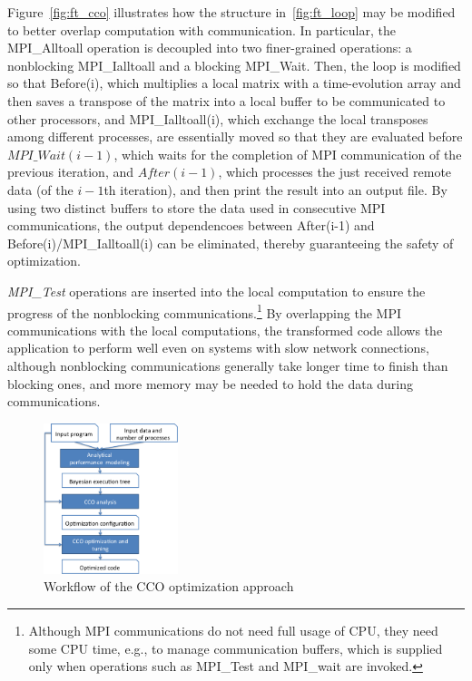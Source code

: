 Figure~\ref{fig:ft_cco} illustrates how the structure in~\ref{fig:ft_loop} may be modified to better overlap computation with communication.
In particular,
   the MPI\_Alltoall operation is decoupled into two finer-grained operations: a nonblocking MPI\_Ialltoall and a blocking MPI\_Wait.
Then, the loop is modified so that Before(i), which multiplies a local matrix with a time-evolution array and then saves a transpose of the matrix into a local buffer to be communicated to other processors,  and MPI\_Ialltoall(i),  which exchange the local transposes among different processes, 
 are essentially moved so that they are evaluated before $MPI\_Wait(i-1)$, which waits for the completion of MPI communication of the previous iteration, and $After(i-1)$, which processes the just received remote data (of the $i-1$th iteration), and then print the result into an output file. 
By using two distinct buffers to store the data used in consecutive MPI communications,  the output dependencoes between After(i-1) and Before(i)/MPI\_Ialltoall(i) can be
eliminated, thereby guaranteeing the safety of optimization.

   \emph{MPI\_Test} operations are inserted into the local computation to ensure the progress of the nonblocking communications.\footnote{
  Although MPI communications do not need full usage of CPU, they need some CPU time,
 e.g., to manage communication buffers,
which is supplied only when operations such as MPI\_Test and MPI\_wait are invoked.}
By overlapping the MPI communications with the local computations, the transformed code
allows the application to perform well even on systems with slow network connections, although
nonblocking communications generally take longer time to finish than blocking ones,
and more memory may be needed to hold the data during communications.

\begin{figure}[h]
\centering
\includegraphics[width=0.35\textwidth]{fig/framework.png} %
\caption{Workflow of the CCO optimization approach}
\label{fig:overview}
\end{figure}

